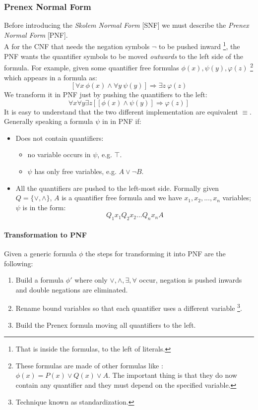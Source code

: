 \documentclass[10pt,a4paper]{article}
\begin{document}
\subsubsection{Prenex Normal Form}
Before introducing the \textit{Skolem Normal Form} [SNF] we must describe the \textit{Prenex Normal Form} [PNF].\\
A for the CNF that needs the negation symbols $\neg$ to be pushed inward \footnote{That is inside the formulas, to the left of literals.}, the PNF wants the quantifier symbols to be moved \textit{outwards} to the left side of the formula. For example, given some quantifier free formulas $\phi(x),\psi(y),\varphi(z)$ \footnote{These formulas are made of other formulas like : $\phi(x)=P(x)\vee Q(x)\vee A$. The important thing is that they do now contain any quantifier and they must depend on the specified variable.  } which appears in a formula as:
\[[\forall x\ \phi(x) \wedge \forall y\ \psi(y)] \Rightarrow \exists z\ \varphi(z)\]
We transform it in PNF just by pushing the quantifiers to the left:
\[\forall x\forall y\exists z[[\phi(x) \wedge \psi(y)] \Rightarrow \varphi(z)]\]
It is easy to understand that the two different implementation are equivalent $\equiv$.\\

Generally speaking a formula $\psi$ in in PNF if:
\begin{itemize}
\item Does not contain quantifiers:
	\begin{itemize}
	\item no variable occurs in $\psi$, e.g. $\top$.
	\item $\psi$ has only free variables, e.g.  $A\vee \neg B$.
	\end{itemize}
\item All the quantifiers are pushed to the left-most side. Formally given $Q=\lbrace \vee, \wedge \rbrace$, $A$ is a quantifier free formula and we have $x_1,x_2,...,x_n$ variables; $\psi$ is in the form:
\[Q_1x_1Q_2x_2...Q_nx_nA\]

\end{itemize}

\paragraph{Transformation to PNF}
Given a generic formula $\phi$ the steps for transforming it into PNF are the following:
\begin{enumerate}
\item Build a formula $\phi'$  where only $\vee, \wedge, \exists, \forall$ occur,  negation is pushed inwards and double negations are eliminated.
\item Rename bound variables so that each quantifier uses a different variable \footnote{Technique known as standardization.}.
\item Build the Prenex formula moving all quantifiers to the left.
\end{enumerate}
\end{document}
